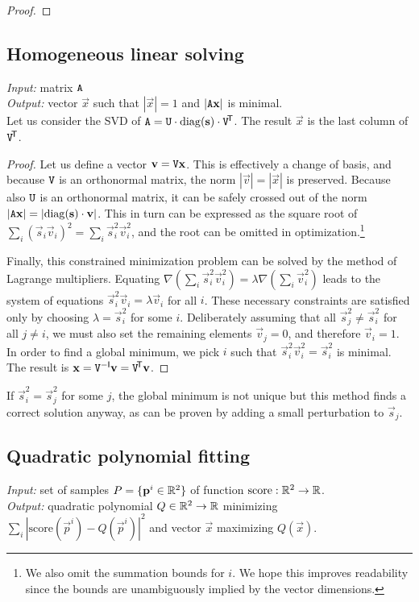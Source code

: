 \begin{proof}
\todo{\dots}
\end{proof}

\subsection{Homogeneous linear solving}
\textit{Input:} matrix $\mathtt{A}$\\
\textit{Output:} vector $\vec x$ such that $|\vec x| = 1$ and $|\mathtt{A} \mathbf{x}|$ is minimal.\\

Let us consider the SVD of $\mathtt{A} = \mathtt{U} \cdot \mathrm{diag}(\mathbf{s}) \cdot \mathtt{V}^{\!\mathsf{T}}$.
The result $\vec x$ is the last column of $\mathtt{V} ^{\!\mathsf{T}}$.

\begin{proof}
Let us define a vector $\mathbf{v} = \mathtt{V} \mathbf{x}$.
This is effectively a change of basis, and because $\mathtt{V}$ is an orthonormal matrix, the norm $|\vec v| = |\vec x|$ is preserved.
Because also $\mathtt{U}$ is an orthonormal matrix, it can be safely crossed out of the norm $|\mathtt{A} \mathbf{x}| = |\mathrm{diag}(\mathbf{s}) \cdot \mathbf{v}|$.
This in turn can be expressed as the square root of $\sum_i (\vec s_i \vec v_i)^2 = \sum_i \vec s_i^2 \vec v_i^2$, and the root can be omitted in optimization.\footnote{
We also omit the summation bounds for $i$. We hope this improves readability since the bounds are unambiguously implied by the vector dimensions.
}

Finally, this constrained minimization problem can be solved by the method of Lagrange multipliers.
Equating $\nabla(\sum_i \vec s_i^2 \vec v_i^2) = \lambda \nabla (\sum_i \vec v_i^2)$ leads to the system of equations $\vec s_i^2 \vec v_i = \lambda \vec v_i$ for all $i$.
These necessary constraints are satisfied only by choosing $\lambda = \vec s_i^2$ for some $i$.
Deliberately assuming that all $\vec s_j^2 \neq \vec s_i^2$ for all $j \neq i$, we must also set the remaining elements $\vec v_j = 0$, and therefore $\vec v_i = 1$.
In order to find a global minimum, we pick $i$ such that $\vec s_i^2 \vec v_i^2 = \vec s_i^2$ is minimal.
The result is $\mathbf{x} = \mathtt{V} ^{-\mathsf{I}} \mathbf{v} = \mathtt{V} ^{\!\mathsf{T}} \mathbf{v}$.
\end{proof}

If $\vec s_i^2 = \vec s_j^2$ for some $j$, the global minimum is not unique but this method finds a correct solution anyway, as can be proven by adding a small perturbation to $\vec s_j$.

\subsection{Quadratic polynomial fitting}
\textit{Input:} set of samples $P = \{\mathbf{p}^i \in \mathbb{R}^2 \}$ of function $\textrm{score}: \mathbb{R}^2 \to \mathbb{R}$.\\
\textit{Output:} quadratic polynomial $Q \in \mathbb{R}^2 \to \mathbb{R}$ minimizing $\sum_i |\textrm{score}(\vec p^i) - Q(\vec p^i)|^2$ and vector $\vec x$ maximizing $Q(\vec x)$.\\

